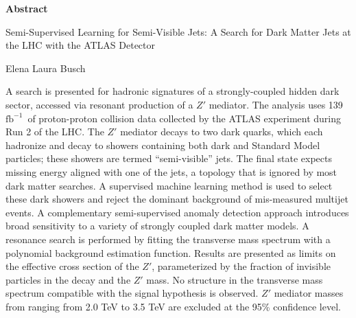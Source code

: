 
\begin{titlepage}
\begin{center}

\vspace*{1.5\baselineskip}
\textbf{\large Abstract}
 \vspace*{1\baselineskip}

Semi-Supervised Learning for Semi-Visible Jets: A Search for Dark Matter Jets at the LHC with the ATLAS Detector

 \vspace*{1\baselineskip}

Elena Laura Busch

 \vspace*{1\baselineskip}

\end{center}
\begin{flushleft}
\hspace{10mm}A search is presented for hadronic signatures of a strongly-coupled hidden dark sector, accessed via resonant production of a $Z'$ mediator. The analysis uses 139 $\text{fb}^{-1}$~of proton-proton collision data collected by the ATLAS experiment during Run 2 of the LHC. The $Z'$ mediator decays to two dark quarks, which each hadronize and decay to showers containing both dark and Standard Model particles; these showers are termed ``semi-visible'' jets. The final state expects missing energy aligned with one of the jets, a topology that is ignored by most dark matter searches. A supervised machine learning method is used to select these dark showers and reject the dominant background of mis-measured multijet events. A complementary semi-supervised anomaly detection approach introduces broad sensitivity to a variety of strongly coupled dark matter models. A resonance search is performed by fitting the transverse mass spectrum with a polynomial background estimation function. Results are presented as limits on the effective cross section of the $Z'$, parameterized by the fraction of invisible particles in the decay and the $Z'$ mass. No structure in the transverse mass spectrum compatible with the signal hypothesis is observed. $Z'$ mediator masses from ranging from 2.0 TeV to 3.5 TeV are excluded at the 95\% confidence level.

\end{flushleft}
\vspace*{\fill}
\end{titlepage}
